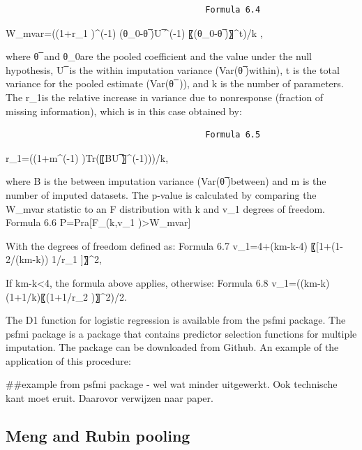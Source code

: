 \documentclass[]{book}
\newenvironment{Shaded}{\begin{snugshade}}{\end{snugshade}}
\newcommand{\NormalTok}[1]{#1}
\theoremstyle{definition}
\theoremstyle{definition}
\theoremstyle{definition}
\theoremstyle{remark}
\begin{document}
\begin{verbatim}
                                        Formula 6.4
\end{verbatim}

W\_mvar=((1+r\_1 )\^{}(-1) (θ\_0-θ ̅)U ̅\^{}(-1) 〖(θ\_0-θ ̅)〗\^{}t)/k ,

where θ ̅ and θ\_0are the pooled coefficient and the value under the null
hypothesis, U ̅ is the within imputation variance (Var(θ ̅)within), t is
the total variance for the pooled estimate (Var(θ ̅ )), and k is the
number of parameters. The r\_1is the relative increase in variance due
to nonresponse (fraction of missing information), which is in this case
obtained by:

\begin{verbatim}
                                        Formula 6.5
\end{verbatim}

r\_1=((1+m\^{}(-1) )Tr(〖BU ̅〗\^{}(-1)))/k,

where B is the between imputation variance (Var(θ ̅)between) and m is the
number of imputed datasets. The p-value is calculated by comparing the
W\_mvar statistic to an F distribution with k and v\_1 degrees of
freedom. Formula 6.6 P=Pra{[}F\_(k,v\_1 )\textgreater{}W\_mvar{]}

With the degrees of freedom defined as: Formula 6.7 v\_1=4+(km-k-4)
〖{[}1+(1-2/(km-k)) 1/r\_1 {]}〗\^{}2,

If km-k\textless{}4, the formula above applies, otherwise: Formula 6.8
v\_1=((km-k)(1+1/k)〖(1+1/r\_2 )〗\^{}2)/2.

The D1 function for logistic regression is available from the psfmi
package. The psfmi package is a package that contains predictor
selection functions for multiple imputation. The package can be
downloaded from Github. An example of the application of this procedure:

\begin{Shaded}
\begin{Highlighting}[]
\NormalTok{##example from psfmi package - wel wat minder uitgewerkt. Ook technische kant moet eruit. Daarovor verwijzen naar paper. }
\end{Highlighting}
\end{Shaded}

\subsection{Meng and Rubin pooling}\label{meng-and-rubin-pooling}
\end{document}
